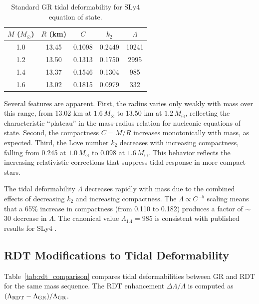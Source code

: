 \documentclass[twocolumn,showpacs,preprintnumbers,amsmath,amssymb,prd]{revtex4-2}
\begin{document}
\begin{table}[h]
\caption{Standard GR tidal deformability for SLy4 equation of state.}
\label{tab:gr_tidal}
\begin{ruledtabular}
\begin{tabular}{ccccc}
$M$ ($M_\odot$) & $R$ (km) & $C$ & $k_2$ & $\Lambda$ \\
\hline
1.0 & 13.45 & 0.1098 & 0.2449 & 10241 \\
1.2 & 13.50 & 0.1313 & 0.1750 & 2995 \\
1.4 & 13.37 & 0.1546 & 0.1304 & 985 \\
1.6 & 13.02 & 0.1815 & 0.0979 & 332 \\
\end{tabular}
\end{ruledtabular}
\end{table}

Several features are apparent. First, the radius varies only weakly with mass over this range, from 13.02 km at $1.6\,M_\odot$ to 13.50 km at $1.2\,M_\odot$, reflecting the characteristic ``plateau'' in the mass-radius relation for nucleonic equations of state. Second, the compactness $C = M/R$ increases monotonically with mass, as expected. Third, the Love number $k_2$ decreases with increasing compactness, falling from 0.245 at $1.0\,M_\odot$ to 0.098 at $1.6\,M_\odot$. This behavior reflects the increasing relativistic corrections that suppress tidal response in more compact stars.

The tidal deformability $\Lambda$ decreases rapidly with mass due to the combined effects of decreasing $k_2$ and increasing compactness. The $\Lambda \propto C^{-5}$ scaling means that a 65\% increase in compactness (from 0.110 to 0.182) produces a factor of $\sim$30 decrease in $\Lambda$. The canonical value $\Lambda_{1.4} = 985$ is consistent with published results for SLy4 \cite{Hinderer2010,Postnikov2010}.

\subsection{RDT Modifications to Tidal Deformability}
\label{sec:results_rdt}

Table~\ref{tab:rdt_comparison} compares tidal deformabilities between GR and RDT for the same mass sequence. The RDT enhancement $\Delta\Lambda/\Lambda$ is computed as $(\Lambda_{\rm RDT} - \Lambda_{\rm GR})/\Lambda_{\rm GR}$.
\end{document}
